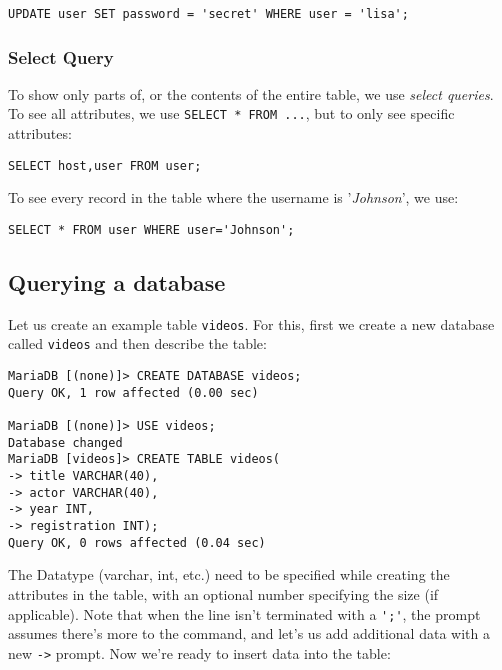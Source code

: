 \vspace{-15pt}
\begin{verbatim}
UPDATE user SET password = 'secret' WHERE user = 'lisa';
\end{verbatim}
\vspace{-10pt}	

\subsubsection{Select Query}
\vspace{-10pt}
To show only parts of, or the contents of the entire table, we use \textit{select queries}. To see all attributes, we use \verb|SELECT * FROM ...|, but to only see specific attributes:

\vspace{-15pt}
\begin{verbatim}
SELECT host,user FROM user;
\end{verbatim}
\vspace{-10pt}	

\noindent
To see every record in the table where the username is '\textit{Johnson}', we use:

\vspace{-15pt}
\begin{verbatim}
SELECT * FROM user WHERE user='Johnson';
\end{verbatim}
\vspace{-10pt}	

\subsection{Querying a database}
Let us create an example table \verb|videos|. For this, first we create a new database called \verb|videos| and then describe the table:

\vspace{-15pt}
\begin{verbatim}
MariaDB [(none)]> CREATE DATABASE videos;
Query OK, 1 row affected (0.00 sec)

MariaDB [(none)]> USE videos;
Database changed
MariaDB [videos]> CREATE TABLE videos(
-> title VARCHAR(40),
-> actor VARCHAR(40),
-> year INT,
-> registration INT);
Query OK, 0 rows affected (0.04 sec)
\end{verbatim}
\vspace{-10pt}	

\noindent
The Datatype (varchar, int, etc.) need to be specified while creating the attributes in the table, with an optional number specifying the size (if applicable). Note that when the line isn't terminated with a \verb|';'|, the prompt assumes there's more to the command, and let's us add additional data with a new \verb|->| prompt. Now we're ready to insert data into the table:

